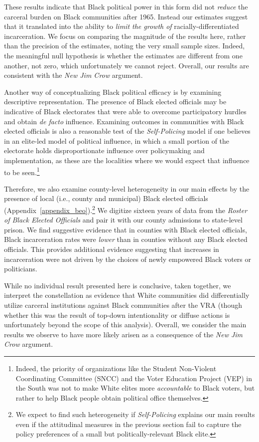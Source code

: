 \documentclass[12pt]{article}
\begin{document}
These results indicate that Black political power in this form did not \emph{reduce} the carceral burden on Black communities after 1965.  Instead our estimates suggest that it translated into the ability to \emph{limit the growth of} racially-differentiated incarceration.  We focus on comparing the magnitude of the results here, rather than the precision of the estimates, noting the very small sample sizes.  Indeed, the meaningful null hypothesis is whether the estimates are different from one another, not zero, which unfortunately we cannot reject.  Overall, our results are consistent with the \emph{New Jim Crow} argument.

Another way of conceptualizing Black political efficacy is by examining descriptive representation. The presence of Black elected officials may be indicative of Black electorates that were able to overcome participatory hurdles and obtain \emph{de facto} influence.  Examining outcomes in communities with Black elected officials is also a reasonable test of the \emph{Self-Policing} model if one believes in an elite-led model of political influence, in which a small portion of the electorate holds disproportionate influence over policymaking and implementation, as these are the localities where we would expect that influence to be seen.\footnote{Indeed, the priority of organizations like the Student Non-Violent Coordinating Committee (SNCC) and the Voter Education Project (VEP) in the South was not to make White elites more \emph{accountable} to Black voters, but rather to help Black people obtain political office themselves.}

Therefore, we also examine county-level heterogeneity in our main effects by the presence of local (i.e., county and municipal) Black elected officials (Appendix~\ref{appendix_beo}).\footnote{We expect to find such heterogeneity if \emph{Self-Policing} explains our main results even if the attitudinal measures in the previous section fail to capture the policy preferences of a small but politically-relevant Black elite.}  We digitize sixteen years of data from the \emph{Roster of Black Elected Officials} and pair it with our county admissions to state-level prison.  We find suggestive evidence that in counties with Black elected officials, Black incarceration rates were \emph{lower} than in counties without any Black elected officials. This provides additional evidence suggesting that increases in incarceration were not driven by the choices of newly empowered Black voters or politicians.

While no individual result presented here is conclusive, taken together, we interpret the constellation as evidence that White communities did differentially utilize carceral institutions against Black communities after the VRA (though whether this was the result of top-down intentionality or diffuse actions is unfortunately beyond the scope of this analysis).  Overall, we consider the main results we observe to have more likely arisen as a consequence of the \emph{New Jim Crow} argument.
\end{document}

